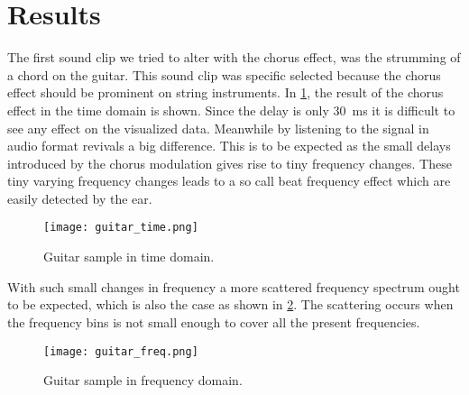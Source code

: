 

\section{Results}
The first sound clip we tried to alter with the chorus effect, was the strumming of a chord on the guitar. This sound clip was specific selected because the chorus effect should be prominent on string instruments. 
In \cref{fig:guitar_time}, the result of the chorus effect in the time domain is shown. Since the delay is only \SI{30}{\milli\second} it is difficult to see any effect on the visualized data. Meanwhile by listening to the signal in audio format revivals a big difference. This is to be expected as the small delays introduced by the chorus modulation gives rise to tiny frequency changes. These tiny varying frequency changes leads to a so call beat frequency effect which are easily detected by the ear.

\begin{figure}[H]
	\centering
	\texttt{[image: guitar\_time.png]}
	\caption{Guitar sample in time domain.}
	\label{fig:guitar_time}
\end{figure}



With such small changes in frequency a more scattered frequency spectrum ought to be expected, which is also the case as shown in \cref{fig:guitar_freq}. The scattering occurs when the frequency bins is not small enough to cover all the present frequencies.
   
\begin{figure}[H]
	\centering
	\texttt{[image: guitar\_freq.png]}
	\caption{Guitar sample in frequency domain.}
	\label{fig:guitar_freq}
\end{figure}






